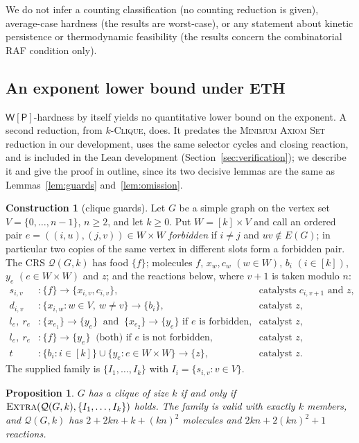 \documentclass[11pt,a4paper]{article}
\theoremstyle{plain}
\newtheorem{proposition}[theorem]{Proposition}
\theoremstyle{definition}
\newtheorem{construction}[theorem]{Construction}
\theoremstyle{remark}
\newcommand{\Extra}{\textup{\textsc{Extra}}}
\newcommand{\MAS}{\textup{\textsc{Minimum Axiom Set}}}
\newcommand{\Clique}{\textup{\textsc{Clique}}}
\newcommand{\WP}{\mathsf{W[P]}}
\newcommand{\cQ}{\mathcal{Q}}
\begin{document}
We do not infer a counting classification (no counting reduction is given), average-case hardness (the results are worst-case), or any statement about kinetic persistence or thermodynamic feasibility (the results concern the combinatorial RAF condition only).

\subsection{An exponent lower bound under ETH}\label{sec:eth}

$\WP$-hardness by itself yields no quantitative lower bound on the exponent. A second reduction, from $k$-\Clique, does. It predates the \MAS{} reduction in our development, uses the same selector cycles and closing reaction, and is included in the Lean development (Section~\ref{sec:verification}); we describe it and give the proof in outline, since its two decisive lemmas are the same as Lemmas~\ref{lem:guards} and~\ref{lem:omission}.

\begin{construction}[clique guards]\label{con:clique}
Let $G$ be a simple graph on the vertex set $V=\{0,\dots,n-1\}$, $n\ge2$, and let $k\ge0$. Put $W=[k]\times V$ and call an ordered pair $e=((i,u),(j,v))\in W\times W$ \emph{forbidden} if $i\ne j$ and $uv\notin E(G)$; in particular two copies of the same vertex in different slots form a forbidden pair. The CRS $\cQ(G,k)$ has food $\{f\}$; molecules $f$, $x_w,c_w$ $(w\in W)$, $b_i$ $(i\in[k])$, $y_e$ $(e\in W\times W)$ and $z$; and the reactions below, where $v+1$ is taken modulo $n$:
\begin{align*}
s_{i,v}&\colon \{f\}\to\{x_{i,v},c_{i,v}\}, &&\text{catalysts } c_{i,v+1} \text{ and } z,\\
d_{i,v}&\colon \{x_{i,w}: w\in V,\ w\ne v\}\to\{b_i\}, &&\text{catalyst } z,\\
l_e,\ r_e&\colon \{x_{e_1}\}\to\{y_e\}\ \text{ and }\ \{x_{e_2}\}\to\{y_e\} \text{ if $e$ is forbidden}, &&\text{catalyst } z,\\
l_e,\ r_e&\colon \{f\}\to\{y_e\}\ \text{ (both) if $e$ is not forbidden}, &&\text{catalyst } z,\\
t&\colon \{b_i: i\in[k]\}\cup\{y_e: e\in W\times W\}\to\{z\}, &&\text{catalyst } z.
\end{align*}
The supplied family is $\{I_1,\dots,I_k\}$ with $I_i=\{s_{i,v}: v\in V\}$.
\end{construction}

\begin{proposition}\label{prop:clique}
$G$ has a clique of size $k$ if and only if $\Extra(\cQ(G,k),\{I_1,\dots,I_k\})$ holds. The family is valid with exactly $k$ members, and $\cQ(G,k)$ has $2+2kn+k+(kn)^2$ molecules and $2kn+2(kn)^2+1$ reactions.
\end{proposition}
\end{document}

